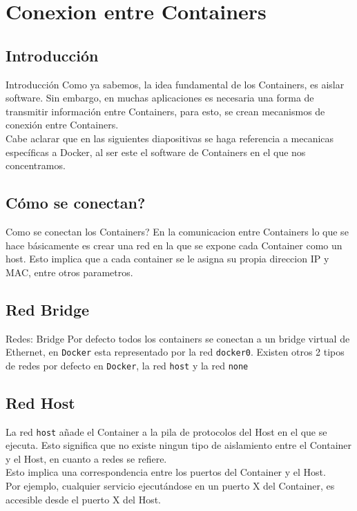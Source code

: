 \documentclass{beamer}
\begin{document}
\section{Conexion entre Containers}

\subsection{Introducción}

\begin{frame}{Introducción}
	Como ya sabemos, la idea fundamental de los Containers, es aislar software. Sin embargo, en muchas aplicaciones es necesaria una forma de transmitir información entre Containers, para esto, se crean mecanismos de conexión entre Containers. \\Cabe aclarar que en las siguientes diapositivas se haga referencia a mecanicas específicas a Docker, al ser este el software de Containers en el que nos concentramos.
\end{frame}

\subsection{Cómo se conectan?}
\begin{frame}{Como se conectan los Containers?}
	En la comunicacion entre Containers lo que se hace básicamente es crear una red en la que se expone cada Container como un host. Esto implica que a cada container se le asigna su propia direccion IP y MAC, entre otros parametros.
\end{frame}

\subsection{Red Bridge}
\begin{frame}{Redes: Bridge}
Por defecto todos los containers se conectan a un bridge virtual de Ethernet, en \texttt{Docker} esta representado por la red \texttt{docker0}. Existen otros 2 tipos de redes por defecto en \texttt{Docker}, la red \texttt{host} y la red \texttt{none}
\end{frame}

\subsection{Red Host}

\begin{frame}
\hspace{1cm} La red \texttt{host} añade el Container a la pila de protocolos del Host en el que se ejecuta. Esto significa que no existe ningun tipo de aislamiento entre el Container y el Host, en cuanto a redes se refiere.\\

\hspace{1cm} Esto implica una correspondencia entre los puertos del Container y el Host. \\

\hspace{1cm} Por ejemplo, cualquier servicio ejecutándose en un puerto X del Container, es accesible desde el puerto X del Host. 
\end{frame}
\end{document}

